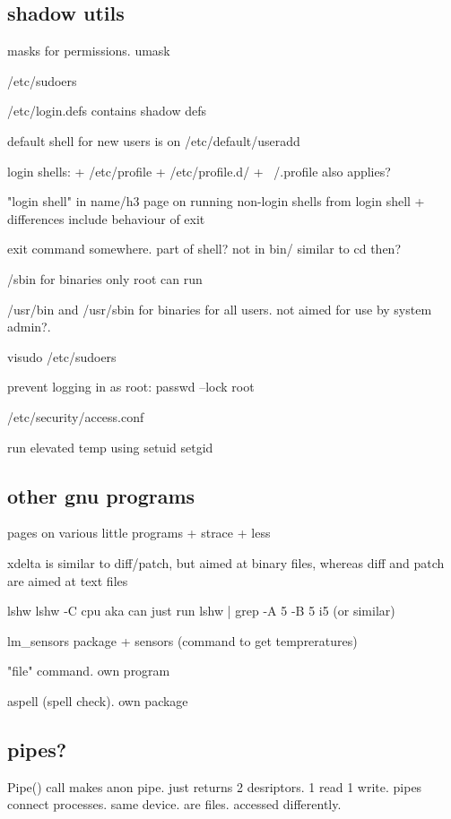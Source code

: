 \subsection{shadow utils}

masks for permissions. umask

/etc/sudoers

/etc/login.defs contains shadow defs

default shell for new users is on /etc/default/useradd

login shells:
+ /etc/profile
+ /etc/profile.d/
+ ~/.profile also applies?

"login shell" in name/h3
page on running non-login shells from login shell
+ differences include behaviour of exit

exit command somewhere. part of shell? not in bin/ similar to cd then?


/sbin for binaries only root can run

/usr/bin and /usr/sbin for binaries for all users. not aimed for use by system admin?.


visudo
/etc/sudoers

prevent logging in as root: passwd --lock root

/etc/security/access.conf

run elevated temp using setuid setgid

\subsection{other gnu programs}

pages on various little programs
+ strace
+ less

xdelta is similar to diff/patch, but aimed at binary files, whereas diff and patch are aimed at text files

lshw
lshw -C cpu aka
can just run lshw | grep -A 5 -B 5 i5 (or similar)

lm\_sensors package
+ sensors (command to get tempreratures)

"file" command. own program

aspell (spell check). own package

\subsection{pipes?}

Pipe() call makes anon pipe. just returns 2 desriptors. 1 read 1 write.
pipes connect processes. same device. are files. accessed differently.

